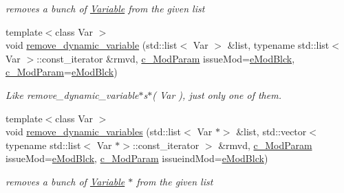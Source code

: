 \begin{Indent}
\begin{DoxyCompactItemize}
\begin{DoxyCompactList}\small\item\em removes a bunch of \mbox{\hyperlink{class_s_m_spp__di__unipi__it_1_1_variable}{Variable}} from the given list \end{DoxyCompactList}\item 
\mbox{\label{class_s_m_spp__di__unipi__it_1_1_block_a4268587eec3784a5ea60034c01d57031}} 
{\footnotesize template$<$class Var $>$ }\\void \mbox{\hyperlink{class_s_m_spp__di__unipi__it_1_1_block_a4268587eec3784a5ea60034c01d57031}{remove\+\_\+dynamic\+\_\+variable}} (std\+::list$<$ Var $>$ \&list, typename std\+::list$<$ Var $>$\+::const\+\_\+iterator \&rmvd, \mbox{\hyperlink{group___modification___t_y_p_e_s_ga544246d8c462e9a2d817c2c30797968f}{c\+\_\+\+Mod\+Param}} issue\+Mod=\mbox{\hyperlink{group___modification___t_y_p_e_s_gga48fddcdd03a03f49b7e389ca1ed938d4a21b14b26b1c0093a0905f6fc010bad29}{e\+Mod\+Blck}}, \mbox{\hyperlink{group___modification___t_y_p_e_s_ga544246d8c462e9a2d817c2c30797968f}{c\+\_\+\+Mod\+Param}}=\mbox{\hyperlink{group___modification___t_y_p_e_s_gga48fddcdd03a03f49b7e389ca1ed938d4a21b14b26b1c0093a0905f6fc010bad29}{e\+Mod\+Blck}})
\begin{DoxyCompactList}\small\item\em Like remove\+\_\+dynamic\+\_\+variable$\ast$s$\ast$( Var ), just only one of them. \end{DoxyCompactList}\item 
{\footnotesize template$<$class Var $>$ }\\void \mbox{\hyperlink{class_s_m_spp__di__unipi__it_1_1_block_a176ce3ef1f4a8c33e242acb066482d45}{remove\+\_\+dynamic\+\_\+variables}} (std\+::list$<$ Var $\ast$$>$ \&list, std\+::vector$<$ typename std\+::list$<$ Var $\ast$$>$\+::const\+\_\+iterator $>$ \&rmvd, \mbox{\hyperlink{group___modification___t_y_p_e_s_ga544246d8c462e9a2d817c2c30797968f}{c\+\_\+\+Mod\+Param}} issue\+Mod=\mbox{\hyperlink{group___modification___t_y_p_e_s_gga48fddcdd03a03f49b7e389ca1ed938d4a21b14b26b1c0093a0905f6fc010bad29}{e\+Mod\+Blck}}, \mbox{\hyperlink{group___modification___t_y_p_e_s_ga544246d8c462e9a2d817c2c30797968f}{c\+\_\+\+Mod\+Param}} issueind\+Mod=\mbox{\hyperlink{group___modification___t_y_p_e_s_gga48fddcdd03a03f49b7e389ca1ed938d4a21b14b26b1c0093a0905f6fc010bad29}{e\+Mod\+Blck}})
\begin{DoxyCompactList}\small\item\em removes a bunch of \mbox{\hyperlink{class_s_m_spp__di__unipi__it_1_1_variable}{Variable}} $\ast$ from the given list \end{DoxyCompactList}\item 

\end{DoxyCompactItemize}
\end{Indent}
